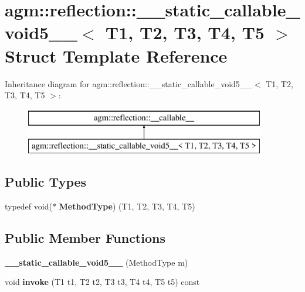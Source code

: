 \hypertarget{structagm_1_1reflection_1_1____static__callable__void5____}{}\section{agm\+:\+:reflection\+:\+:\+\_\+\+\_\+static\+\_\+callable\+\_\+void5\+\_\+\+\_\+$<$ T1, T2, T3, T4, T5 $>$ Struct Template Reference}
\label{structagm_1_1reflection_1_1____static__callable__void5____}
Inheritance diagram for agm\+:\+:reflection\+:\+:\+\_\+\+\_\+static\+\_\+callable\+\_\+void5\+\_\+\+\_\+$<$ T1, T2, T3, T4, T5 $>$\+:\begin{figure}[H]
\begin{center}
\leavevmode
\includegraphics[height=2.000000cm]{structagm_1_1reflection_1_1____static__callable__void5____}
\end{center}
\end{figure}
\subsection*{Public Types}
\begin{DoxyCompactItemize}
\item 
typedef void($\ast$ {\bfseries Method\+Type}) (T1, T2, T3, T4, T5)\hypertarget{structagm_1_1reflection_1_1____static__callable__void5_____aa34bcfbb7b4863823e332dba6fd99027}{}\label{structagm_1_1reflection_1_1____static__callable__void5_____aa34bcfbb7b4863823e332dba6fd99027}

\end{DoxyCompactItemize}
\subsection*{Public Member Functions}
\begin{DoxyCompactItemize}
\item 
{\bfseries \+\_\+\+\_\+static\+\_\+callable\+\_\+void5\+\_\+\+\_\+} (Method\+Type m)\hypertarget{structagm_1_1reflection_1_1____static__callable__void5_____aad2e2d9e9982d0a4f7843aa7b27e9eed}{}\label{structagm_1_1reflection_1_1____static__callable__void5_____aad2e2d9e9982d0a4f7843aa7b27e9eed}

\item 
void {\bfseries invoke} (T1 t1, T2 t2, T3 t3, T4 t4, T5 t5) const \hypertarget{structagm_1_1reflection_1_1____static__callable__void5_____aebaae8a7b7f6fcbb95b3323bdae0c4c8}{}\label{structagm_1_1reflection_1_1____static__callable__void5_____aebaae8a7b7f6fcbb95b3323bdae0c4c8}

\end{DoxyCompactItemize}
